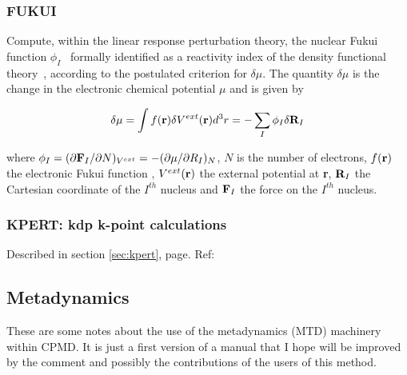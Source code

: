 \documentclass[twoside,10pt,titlepage,a4paper]{article}
\begin{document}
\subsubsection{FUKUI}
Compute, within the linear response perturbation theory, the nuclear Fukui
function $\phi _I$~\cite{fukui} formally identified as a reactivity index of the 
density functional theory~\cite{fukui2,fukui3}, according to the postulated
criterion for $\delta \mu$.
The quantity $\delta \mu$ is the change in the electronic chemical
potential $\mu$ and is given by

\begin{equation}
\delta \mu =\int f({\bf r}) \delta V^{ext}({\bf r}) d^3r
= -\sum_I \phi_I \delta {\bf R}_I
\end{equation}

where $\phi _I =(\partial {\bf F}_I/\partial N)_{V^{ext}}=
-(\partial \mu /\partial R_I)_N$, $N$ is the number of electrons,
$f({\bf r})$ the electronic Fukui function \cite{fukui,fukui2},
$V^{ext}({\bf r})$ the external
potential at {\bf r}, ${\bf R}_I$ the Cartesian coordinate of the
$I^{th}$ nucleus and ${\bf F}_I$ the force on the $I^{th}$ nucleus.

\subsubsection{KPERT: kdp k-point calculations}
Described in section \ref{sec:kpert}, page{\pageref{sec:kpert}}.
Ref: \cite{mimp}


\subsection{Metadynamics}\label{sec:meta}

These are some notes about the use of the metadynamics (MTD) machinery within CPMD.
It is just a first version of a manual that I hope will be improved by the comment
and possibly the contributions of the users of this method.
\end{document}
